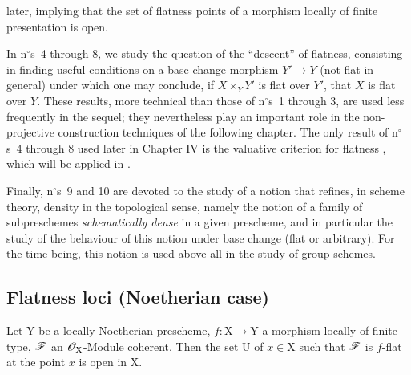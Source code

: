 later, implying that the set of flatness points of a morphism locally of finite
presentation is open.

In n$^\circ$s~4 through 8, we study the question of the ``descent'' of
flatness, consisting in finding useful conditions on a base-change morphism
$Y'\to Y$ (not flat in general) under which one may conclude, if
$X\times_YY'$ is flat over $Y'$, that $X$ is flat over $Y$. These results,
more technical than those of n$^\circ$s~1 through 3, are used less frequently
in the sequel; they nevertheless play an important role in the non-projective
construction techniques of the following chapter. The only result of
n$^\circ$s~4 through 8 used later in Chapter IV is the valuative criterion for
flatness , which will be applied in .

Finally, n$^\circ$s~9 and 10 are devoted to the study of a notion that refines,
in scheme theory, density in the topological sense, namely the notion of a
family of subpreschemes \emph{schematically dense} in a given prescheme, and
in particular the study of the behaviour of this notion under base change
(flat or arbitrary). For the time being, this notion is used above all in the
study of group schemes.


\subsection{Flatness loci (Noetherian case)}
\label{subsection:IV.11.1}

\begin{theorem}[11.1.1]
\label{IV.11.1.1}
Let $\mathrm{Y}$ be a locally Noetherian prescheme, $f:\mathrm{X}\to\mathrm{Y}$ a morphism locally of finite type, $\mathscr{F}$ an $\mathscr{O}_\mathrm{X}$-Module coherent. Then the set $\mathrm{U}$ of $x\in\mathrm{X}$ such that $\mathscr{F}$ is $f$-flat at the point $x$ is open in $\mathrm{X}$.
\end{theorem}

